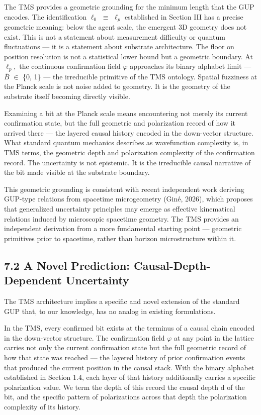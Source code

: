 \documentclass[11pt,oneside]{report}
\theoremstyle{definition}
\theoremstyle{remark}
\begin{document}
The TMS provides a geometric grounding for the minimum length that the
GUP encodes. The identification \ensuremath{\ell_{0}} \ensuremath{\equiv} \ensuremath{\ell_{p}} established in Section III has a
precise geometric meaning: below the agent scale, the emergent 3D
geometry does not exist. This is not a statement about measurement
difficulty or quantum fluctuations --- it is a statement about substrate
architecture. The floor on position resolution is not a statistical
lower bound but a geometric boundary. At \ensuremath{\ell_{p},} the continuous confirmation
field \ensuremath{\varphi} approaches its binary alphabet limit --- \ensuremath{\bar{B}} \ensuremath{\in} \{0, 1\} --- the
irreducible primitive of the TMS ontology. Spatial fuzziness at the
Planck scale is not noise added to geometry. It is the geometry of the
substrate itself becoming directly visible.

Examining a bit at the Planck scale means encountering not merely its
current confirmation state, but the full geometric and polarization
record of how it arrived there --- the layered causal history encoded in
the down-vector structure. What standard quantum mechanics describes as
wavefunction complexity is, in TMS terms, the geometric depth and
polarization complexity of the confirmation record. The uncertainty is
not epistemic. It is the irreducible causal narrative of the bit made
visible at the substrate boundary.

This geometric grounding is consistent with recent independent work
deriving GUP-type relations from spacetime microgeometry (Giné, 2026),
which proposes that generalized uncertainty principles may emerge as
effective kinematical relations induced by microscopic spacetime
geometry. The TMS provides an independent derivation from a more
fundamental starting point --- geometric primitives prior to spacetime,
rather than horizon microstructure within it.

\subsection*{7.2 A Novel Prediction: Causal-Depth-Dependent Uncertainty}

The TMS architecture implies a specific and novel extension of the
standard GUP that, to our knowledge, has no analog in existing
formulations.

In the TMS, every confirmed bit exists at the terminus of a causal chain
encoded in the down-vector structure. The confirmation field \ensuremath{\varphi} at any
point in the lattice carries not only the current confirmation state but
the full geometric record of how that state was reached --- the layered
history of prior confirmation events that produced the current position
in the causal stack. With the binary alphabet established in Section
1.4, each layer of that history additionally carries a specific
polarization value. We term the depth of this record the causal depth d
of the bit, and the specific pattern of polarizations across that depth
the polarization complexity of its history.
\end{document}
